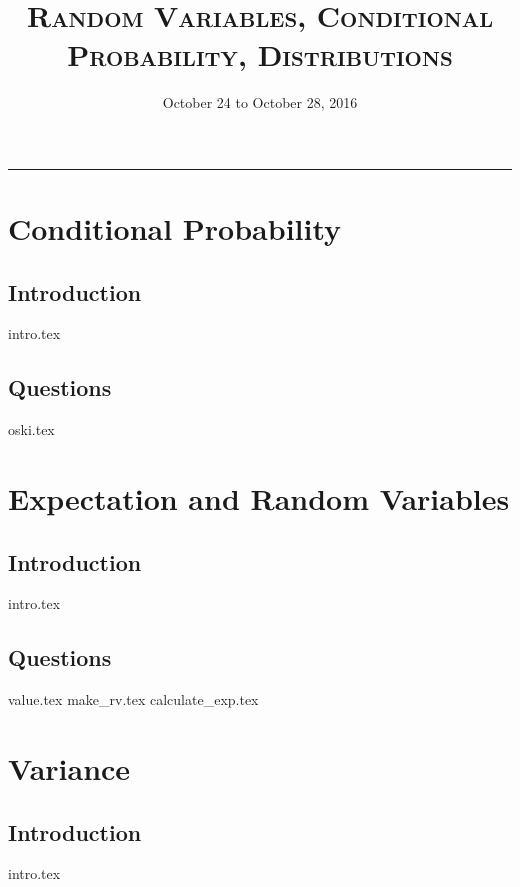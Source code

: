 \documentclass{exam}
\title{\textsc{Random Variables, Conditional Probability, Distributions}}
\date{October 24 to October 28, 2016}
\begin{document}
\maketitle
\rule{\textwidth}{0.15em}
\fontsize{12}{15}\selectfont
\thispagestyle{empty}

\section{Conditional Probability}
\subsection{Introduction}
{intro.tex}
\clearpage
\subsection{Questions}
\begin{questions}
{oski.tex}
\end{questions}

\section{Expectation and Random Variables}
\subsection{Introduction}
{intro.tex}
\subsection{Questions}
\begin{questions}
{value.tex}
{make_rv.tex}
{calculate_exp.tex}
\end{questions}

\section{Variance}
\subsection{Introduction}
{intro.tex}
\end{document}
